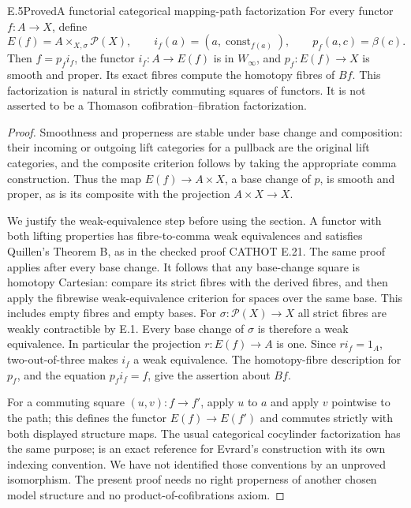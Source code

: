 \begin{result}{E.5}{Proved}{A functorial categorical mapping-path factorization}
For every functor $f:A\to X$, define
\[
 E(f)=A\times_{X,\sigma}\mathcal P(X),\qquad
 i_f(a)=(a,\operatorname{const}_{f(a)}),\qquad
 p_f(a,c)=\beta(c).
\]
Then $f=p_fi_f$, the functor $i_f:A\to E(f)$ is in $W_\infty$, and $p_f:E(f)\to X$ is smooth and proper. Its exact fibres compute the homotopy fibres of $Bf$. This factorization is natural in strictly commuting squares of functors. It is not asserted to be a Thomason cofibration--fibration factorization.
\end{result}
\begin{proof}
Smoothness and properness are stable under base change and composition: their incoming or outgoing lift categories for a pullback are the original lift categories, and the composite criterion follows by taking the appropriate comma construction. Thus the map $E(f)\to A\times X$, a base change of $p$, is smooth and proper, as is its composite with the projection $A\times X\to X$.

We justify the weak-equivalence step before using the section. A functor with both lifting properties has fibre-to-comma weak equivalences and satisfies Quillen's Theorem B, as in the checked proof CATHOT E.21. The same proof applies after every base change. It follows that any base-change square is homotopy Cartesian: compare its strict fibres with the derived fibres, and then apply the fibrewise weak-equivalence criterion for spaces over the same base. This includes empty fibres and empty bases. For $\sigma:\mathcal P(X)\to X$ all strict fibres are weakly contractible by E.1. Every base change of $\sigma$ is therefore a weak equivalence. In particular the projection $r:E(f)\to A$ is one. Since $ri_f=1_A$, two-out-of-three makes $i_f$ a weak equivalence. The homotopy-fibre description for $p_f$, and the equation $p_fi_f=f$, give the assertion about $Bf$.

For a commuting square $(u,v):f\to f'$, apply $u$ to $a$ and apply $v$ pointwise to the path; this defines the functor $E(f)\to E(f')$ and commutes strictly with both displayed structure maps. The usual categorical cocylinder factorization has the same purpose; \citet[Theorem 2.8]{Shoikhet2016} is an exact reference for Evrard's construction with its own indexing convention. We have not identified those conventions by an unproved isomorphism. The present proof needs no right properness of another chosen model structure and no product-of-cofibrations axiom.
\end{proof}

